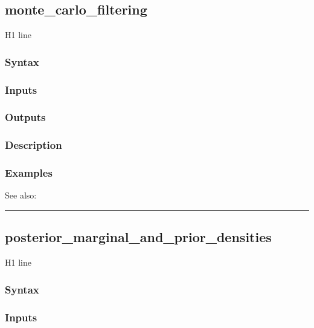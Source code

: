 \documentclass[letterpaper,10pt,english]{sphinxmanual}
\begin{document}
\subsection{monte\_carlo\_filtering}
\label{classes/models/@dsge/dsge:monte-carlo-filtering}\label{classes/models/@dsge/dsge:id104}
H1 line


\subsubsection{Syntax}
\label{classes/models/@dsge/dsge:id105}

\subsubsection{Inputs}
\label{classes/models/@dsge/dsge:id106}

\subsubsection{Outputs}
\label{classes/models/@dsge/dsge:id107}

\subsubsection{Description}
\label{classes/models/@dsge/dsge:id108}

\subsubsection{Examples}
\label{classes/models/@dsge/dsge:id109}
See also:


\bigskip\hrule{}\bigskip



\subsection{posterior\_marginal\_and\_prior\_densities}
\label{classes/models/@dsge/dsge:id110}\label{classes/models/@dsge/dsge:posterior-marginal-and-prior-densities}
H1 line


\subsubsection{Syntax}
\label{classes/models/@dsge/dsge:id111}

\subsubsection{Inputs}
\label{classes/models/@dsge/dsge:id112}
\end{document}
